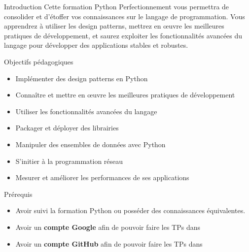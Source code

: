 \begin{frame}{Introduction}
  Cette formation Python Perfectionnement vous permettra de consolider et d’étoffer vos connaissances sur le langage de programmation.
  Vous apprendrez à utiliser les design patterns, mettrez en œuvre les meilleures pratiques de développement, et saurez exploiter les fonctionnalités avancées du langage pour développer des applications stables et robustes.
\end{frame}

\begin{frame}{Objectifs pédagogiques}
  \begin{itemize}
    \item Implémenter des design patterns en Python
    \item Connaître et mettre en œuvre les meilleures pratiques de développement
    \item Utiliser les fonctionnalités avancées du langage
    \item Packager et déployer des librairies
    \item Manipuler des ensembles de données avec Python
    \item S’initier à la programmation réseau
    \item Mesurer et améliorer les performances de ses applications
  \end{itemize}
\end{frame}

\begin{frame}{Prérequis}
  \begin{itemize}
    \item Avoir suivi la formation Python ou posséder des connaissances équivalentes.
    \item Avoir un \textbf{compte Google} afin de pouvoir faire les TPs dans 
    \item Avoir un \textbf{compte GitHub} afin de pouvoir faire les TPs dans 
  \end{itemize}
\end{frame}
